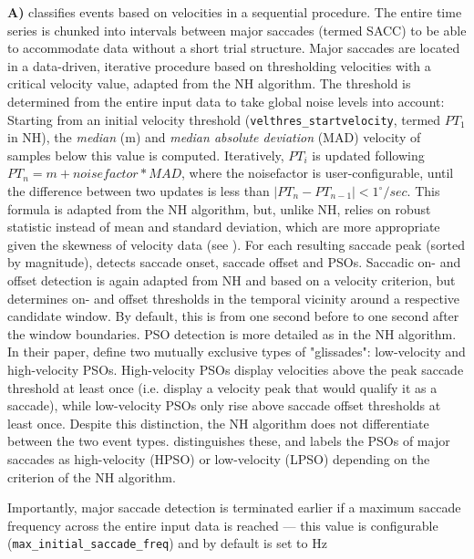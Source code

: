 \begin{enumerate}
 \textbf{A)} \remodnav classifies events based on velocities in a sequential procedure. The entire time series is chunked into intervals between major saccades (termed SACC) to be able to accommodate data without a short trial structure. Major saccades are located in a data-driven, iterative procedure based on thresholding velocities with a critical velocity value, adapted from the NH algorithm. The threshold is determined from the entire input data to take global noise levels into account: Starting from an initial velocity threshold (\texttt{velthres\_startvelocity}, termed $PT_1$ in NH), the \textit{median} (m) and \textit{median absolute deviation} (MAD) velocity of samples below this value is computed. Iteratively, $PT_i$ is updated following $PT_n = m + noisefactor * MAD$, where the noisefactor is user-configurable, until the difference between two updates is less than $|PT_n - PT_{n-1}| < 1^\circ/sec$. This formula is adapted from the NH algorithm, but, unlike NH, relies on robust statistic instead of mean and standard deviation, which are more appropriate given the skewness of velocity data (see \cite{Friedman2018}). For each resulting saccade peak (sorted by magnitude), \remodnav detects saccade onset, saccade offset and PSOs. Saccadic on- and offset detection is again adapted from NH and based on a velocity criterion, but determines on- and offset thresholds in the temporal vicinity around a respective candidate window. By default, this is from one second before to one second after the window boundaries. PSO detection is more detailed as in the NH algorithm. In their paper, \cite{Nystrom2010AnData} define two mutually exclusive types of "glissades": low-velocity and high-velocity PSOs. High-velocity PSOs display velocities above the peak saccade threshold at least once (i.e. display a velocity peak that would qualify it as a saccade), while low-velocity PSOs only rise above saccade offset thresholds at least once. Despite this distinction, the NH algorithm does not differentiate between the two event types. \remodnav distinguishes these, and labels the PSOs of major saccades as high-velocity (HPSO) or low-velocity (LPSO) depending on the criterion of the NH algorithm.
 
 Importantly, major saccade detection is terminated earlier if a maximum saccade frequency across the entire input data is reached --- this value is configurable (\texttt{max\_initial\_saccade\_freq}) and by default is set to \unit[2]{Hz} \\
 

\end{enumerate}
